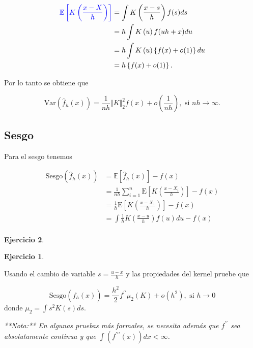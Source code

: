 \documentclass[
  12pt,
]{book}
\theoremstyle{definition}
\theoremstyle{definition}
\theoremstyle{definition}
\newtheorem{exercise}{Ejercicio}[chapter]
\theoremstyle{remark}
\begin{document}
\begin{align*}
\textcolor{blue}{\mathbb{E}\left[K\left(\frac{x-X}{h}\right)\right]}
& =\int K\left(\frac{x-s}{h}\right)f(s)ds            \\
& = h\int K\left(u\right)f(uh+x)du                    \\
& =h\int K\left(u\right)\left\{ f(x)+o(1)\right\} du \\
& =h\left\{f(x)+o(1)\right\} .
\end{align*}

Por lo tanto se obtiene que

\begin{equation*}
\mathrm{Var}\left(\hat{f}_{h}(x)\right) = \frac{1}{nh} \Vert K\Vert_{2}^{2}f(x) + o\left(\frac{1}{nh}\right), \text{ si } nh\to \infty.
\end{equation*}

\hypertarget{sesgo-1}{%
\subsection{Sesgo}\label{sesgo-1}}

Para el sesgo tenemos

\begin{align*}
\mathrm{Sesgo}\left(\hat{f}_{h}(x)\right)
& = \mathbb{E}\left[\hat{f}_{h}(x)\right]-f(x)                                                  \\
& = \frac{1}{nh} \sum_{i=1}^{n} \mathrm{E}\left[K\left( \frac{x-X_{i}}{h} \right)\right] - f(x) \\
& = \frac{1}{h}\mathrm{E}\left[K\left( \frac{x-X_{1}}{h} \right)\right] - f(x)                  \\
& = \int \frac{1}{h} K\left( \frac{x-u}{h}\right)f(u)du -f(x)                                   \\
\end{align*}

\begin{exercise}
\begin{exercise}
\protect\hypertarget{exr:unlabeled-div-12}{}\label{exr:unlabeled-div-12}

\protect\hypertarget{exr:unnamed-chunk-23}{}{\label{exr:unnamed-chunk-23} }Usando el cambio de variable \(s=\frac{u-x}{h}\) y las propiedades del kernel pruebe que

\begin{equation*}
\mathrm{Sesgo}\left(\hat{f}_{h}(x)\right) = \frac{h^{2}}{2} f^{\prime\prime} \mu_{2}(K) + o(h^{2}), \text{ si } h\to 0
\end{equation*}
donde \(\mu_{2}=\int s^{2}K(s)ds\).

\emph{**Nota:** En algunas pruebas más formales, se necesita
además que  $f^{\prime\prime}$ sea absolutamente continua y que
$\int(f^{\prime\prime\prime}(x))dx<\infty$.}

\end{exercise}
\end{exercise}
\end{document}
